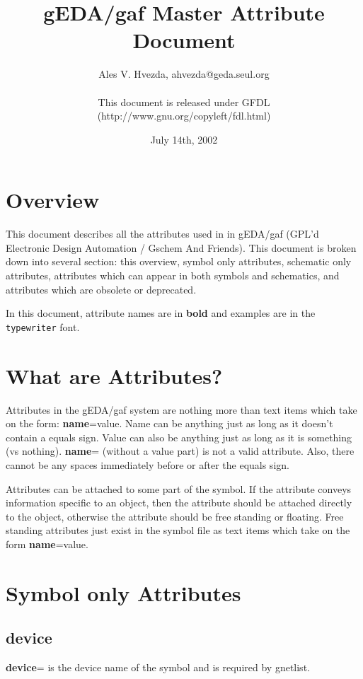\documentclass{article}
\title{gEDA/gaf Master Attribute Document}
\author{Ales V. Hvezda, ahvezda@geda.seul.org\\
	\\
	This document is released under GFDL\\ 
	(http://www.gnu.org/copyleft/fdl.html)}
\date{July 14th, 2002}
\begin{document}
\maketitle
\newpage

\tableofcontents
\newpage


\section{Overview}

This document describes all the attributes used in in gEDA/gaf (GPL'd
Electronic Design Automation / Gschem And Friends).  This document
is broken down into several section: this overview, symbol only
attributes, schematic only attributes, attributes which can appear
in both symbols and schematics, and attributes which are obsolete or
deprecated.

In this document, attribute names are in {\bf bold} and examples
are in the \texttt{typewriter} font.

\section{What are Attributes?}

Attributes in the gEDA/gaf system are nothing more than text items
which take on the form: {\bf name}=value.  Name can be anything just as long
as it doesn't contain a equals sign.  Value can also be anything just
as long as it is something (vs nothing).  {\bf name}= (without a value part)
is not a valid attribute.  Also, there cannot be any spaces immediately
before or after the equals sign.

Attributes can be attached to some part of the symbol.  If the attribute
conveys information specific to an object, then the attribute should
be attached directly to the object, otherwise the attribute should be
free standing or floating.  Free standing attributes just exist in the
symbol file as text items which take on the form {\bf name}=value.

\newpage

\section{Symbol only Attributes}


\subsection{\bf device\label{device}}
{\bf device}= is the device name of the symbol and is required by gnetlist.  
\end{document}
